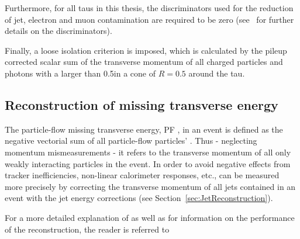 Furthermore, for all taus in this thesis, the discriminators used for the reduction of jet, electron and muon contamination are required to be zero (see~\cite{bib:CMS:TauReconstruction_8TeV} for further details on the discriminators).

Finally, a loose isolation criterion is imposed, which is calculated by the pileup corrected scalar sum of the transverse momentum of all charged particles and photons with a \pt larger than 0.5\gev in a cone of $R=0.5$ around the tau.

\subsection{Reconstruction of missing transverse energy}
The particle-flow missing transverse energy, PF \met, in an event is defined as the negative vectorial sum of all particle-flow particles' \pt.
Thus - neglecting momentum mismeasurements - it refers to the transverse momentum of all only weakly interacting particles in the event.
In order to avoid negative effects from \eg tracker inefficiencies, non-linear calorimeter responses, etc., \met can be measured more precisely by correcting the transverse momentum of all jets contained in an event with the jet energy corrections (see Section~\ref{sec:JetReconstruction}).

For a more detailed explanation of \met as well as for information on the performance of the reconstruction, the reader is referred to~\cite{bib:CMS:METReconstruction}

